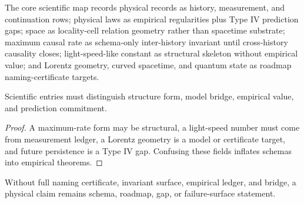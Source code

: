 \begin{definition}
\label{def:philosophy-core-scientific-map}
The core scientific map records physical records as history,
measurement, and continuation rows; physical laws as empirical
regularities plus Type IV prediction gaps; space as locality-cell
relation geometry rather than spacetime substrate; maximum causal rate
as schema-only inter-history invariant until cross-history causality
closes; light-speed-like constant as structural skeleton without
empirical value; and Lorentz geometry, curved spacetime, and quantum
state as roadmap naming-certificate targets.
\end{definition}

\begin{theorem}
\label{thm:philosophy-scientific-map-separates}
Scientific entries must distinguish structure form, model bridge,
empirical value, and prediction commitment.
\end{theorem}
\begin{proof}
A maximum-rate form may be structural, a light-speed number must come
from measurement ledger, a Lorentz geometry is a model or certificate
target, and future persistence is a Type IV gap. Confusing these fields
inflates schemas into empirical theorems.
\end{proof}

\begin{corollary}
\label{cor:philosophy-physical-claims-default-downward}
Without full naming certificate, invariant surface, empirical ledger,
and bridge, a physical claim remains schema, roadmap, gap, or
failure-surface statement.
\end{corollary}

